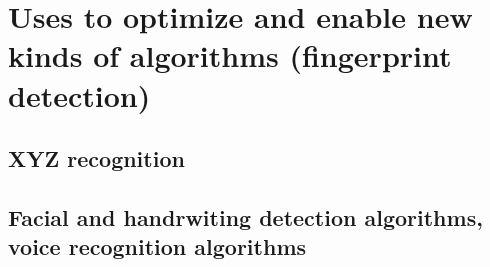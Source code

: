 \documentclass[12pt]{extarticle}
\begin{document}
    \section{Uses to optimize and enable new kinds of algorithms (fingerprint detection)}
    \subsection{XYZ recognition}
    \blindtext[1]
    \subsection{Facial and handrwiting detection algorithms, voice recognition algorithms}
    \blindtext[1]
    
    \pagebreak
    
    
    
\end{document}
